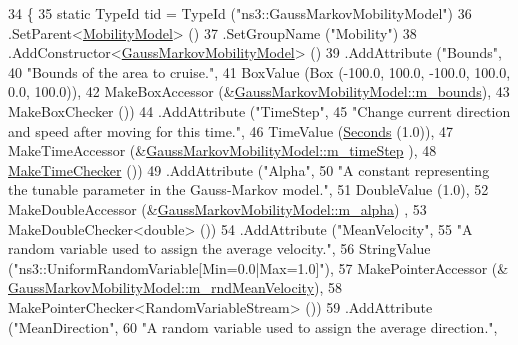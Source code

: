 \begin{DoxyCode}
34 \{
35   \textcolor{keyword}{static} TypeId tid = TypeId (\textcolor{stringliteral}{"ns3::GaussMarkovMobilityModel"})
36     .SetParent<\hyperlink{classns3_1_1MobilityModel_af61ca3dbc723d8109d115fb081fd0299}{MobilityModel}> ()
37     .SetGroupName (\textcolor{stringliteral}{"Mobility"})
38     .AddConstructor<\hyperlink{classns3_1_1GaussMarkovMobilityModel_aa151f31da16245cc8bd7fd05e64a3cee}{GaussMarkovMobilityModel}> ()
39     .AddAttribute (\textcolor{stringliteral}{"Bounds"},
40                    \textcolor{stringliteral}{"Bounds of the area to cruise."},
41                    BoxValue (Box (-100.0, 100.0, -100.0, 100.0, 0.0, 100.0)),
42                    MakeBoxAccessor (&\hyperlink{classns3_1_1GaussMarkovMobilityModel_a067131b9dbb814e9f9f1715cb779fc73}{GaussMarkovMobilityModel::m\_bounds}),
43                    MakeBoxChecker ())
44     .AddAttribute (\textcolor{stringliteral}{"TimeStep"},
45                    \textcolor{stringliteral}{"Change current direction and speed after moving for this time."},
46                    TimeValue (\hyperlink{group__timecivil_ga33c34b816f8ff6628e33d5c8e9713b9e}{Seconds} (1.0)),
47                    MakeTimeAccessor (&\hyperlink{classns3_1_1GaussMarkovMobilityModel_afa00618cec1c364159271f8c61d1defd}{GaussMarkovMobilityModel::m\_timeStep}
      ),
48                    \hyperlink{group__time_ga7032965bd4afa578691d88c09e4481c1}{MakeTimeChecker} ())
49     .AddAttribute (\textcolor{stringliteral}{"Alpha"},
50                    \textcolor{stringliteral}{"A constant representing the tunable parameter in the Gauss-Markov model."},
51                    DoubleValue (1.0),
52                    MakeDoubleAccessor (&\hyperlink{classns3_1_1GaussMarkovMobilityModel_aeb2ea990f5ea57e38cf53470f613863c}{GaussMarkovMobilityModel::m\_alpha})
      ,
53                    MakeDoubleChecker<double> ())
54     .AddAttribute (\textcolor{stringliteral}{"MeanVelocity"},
55                    \textcolor{stringliteral}{"A random variable used to assign the average velocity."},
56                    StringValue (\textcolor{stringliteral}{"ns3::UniformRandomVariable[Min=0.0|Max=1.0]"}),
57                    MakePointerAccessor (&
      \hyperlink{classns3_1_1GaussMarkovMobilityModel_a9b9673143fb0414e80eeb54587fd412d}{GaussMarkovMobilityModel::m\_rndMeanVelocity}),
58                    MakePointerChecker<RandomVariableStream> ())
59     .AddAttribute (\textcolor{stringliteral}{"MeanDirection"},
60                    \textcolor{stringliteral}{"A random variable used to assign the average direction."},

\end{DoxyCode}
